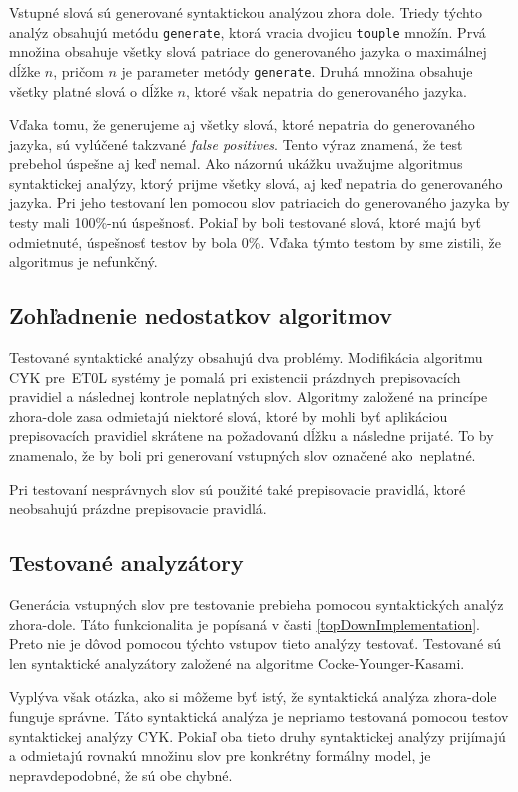 Vstupné slová sú generované syntaktickou analýzou zhora dole. Triedy týchto analýz obsahujú metódu \texttt{generate}, ktorá vracia dvojicu \texttt{touple} množín. Prvá množina obsahuje všetky slová patriace do generovaného jazyka o maximálnej dĺžke $n$, pričom $n$ je parameter metódy \texttt{generate}. Druhá množina obsahuje všetky platné slová o dĺžke $n$, ktoré však nepatria do generovaného jazyka.

Vďaka tomu, že generujeme aj všetky slová, ktoré nepatria do generovaného jazyka, sú vylúčené takzvané \textit{false positives}. Tento výraz znamená, že test prebehol úspešne aj keď nemal. Ako názornú ukážku uvažujme algoritmus syntaktickej analýzy, ktorý prijme všetky slová, aj keď nepatria do generovaného jazyka. Pri jeho testovaní len pomocou slov patriacich do generovaného jazyka by testy mali 100\%-nú úspešnosť. Pokiaľ by boli testované slová, ktoré majú byť odmietnuté, úspešnosť testov by bola 0\%. Vďaka týmto testom by sme zistili, že algoritmus je nefunkčný.

\subsection{Zohľadnenie nedostatkov algoritmov}
Testované syntaktické analýzy obsahujú dva problémy. Modifikácia algoritmu CYK pre~ET0L systémy je pomalá pri existencii prázdnych prepisovacích pravidiel a následnej kontrole neplatných slov. Algoritmy založené na princípe zhora-dole zasa odmietajú niektoré slová, ktoré by mohli byť aplikáciou prepisovacích pravidiel skrátene na požadovanú dĺžku a následne prijaté. To by znamenalo, že by boli pri generovaní vstupných slov označené ako~neplatné.

Pri testovaní nesprávnych slov sú použité také prepisovacie pravidlá, ktoré neobsahujú prázdne prepisovacie pravidlá.

\subsection*{Testované analyzátory}
Generácia vstupných slov pre testovanie prebieha pomocou syntaktických analýz zhora-dole. Táto funkcionalita je popísaná v časti \ref{topDownImplementation}. Preto nie je dôvod pomocou týchto vstupov tieto analýzy testovať. Testované sú len syntaktické analyzátory založené na algoritme Cocke-Younger-Kasami.

Vyplýva však otázka, ako si môžeme byť istý, že syntaktická analýza zhora-dole funguje správne. Táto syntaktická analýza je nepriamo testovaná pomocou testov syntaktickej analýzy CYK. Pokiaľ oba tieto druhy syntaktickej analýzy prijímajú a odmietajú rovnakú množinu slov pre konkrétny formálny model, je nepravdepodobné, že sú obe chybné.

